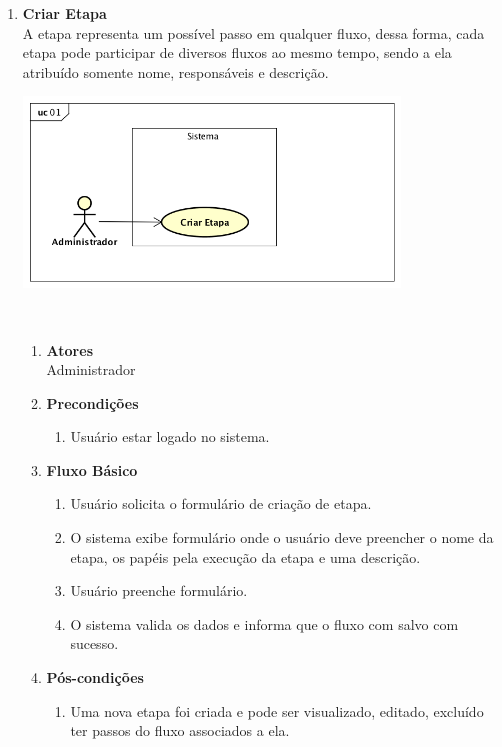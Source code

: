 \begin{enumerate}[label=\textbf{UC01}, leftmargin=2cm]
	\item \textbf{Criar Etapa} \\
	A etapa representa um possível passo em qualquer fluxo, dessa forma, cada etapa pode participar de diversos fluxos ao mesmo tempo, sendo a ela atribuído somente nome, responsáveis e descrição. \\
	\begin{minipage}[c]{10cm}
	    \includegraphics[width=10cm]{Imagens/UC_CriarEtapa.png}
		\label{fig:uc_criar_fluxo}
	\end{minipage} \\

	\begin{enumerate}[label=, leftmargin=0cm]
		\item \textbf{Atores} \\
		Administrador
		\item \textbf{Precondições}
			\begin{enumerate}[label=\arabic*.]
				\item Usuário estar logado no sistema.
			\end{enumerate}
		\item \textbf{Fluxo Básico}
			\begin{enumerate}[label=\arabic*.]
				\item Usuário solicita o formulário de criação de etapa.
				\item O sistema exibe formulário onde o usuário deve preencher o nome da etapa, os papéis pela execução da etapa e uma descrição.
				\item Usuário preenche formulário.
				\item O sistema valida os dados e informa que o fluxo com salvo com sucesso.
			\end{enumerate}
		\item \textbf{Pós-condições}
			\begin{enumerate}[label=\arabic*.]
				\item Uma nova etapa foi criada e pode ser visualizado, editado, excluído ter passos do fluxo associados a ela.
			\end{enumerate}
	\end{enumerate}
	 
\end{enumerate}

